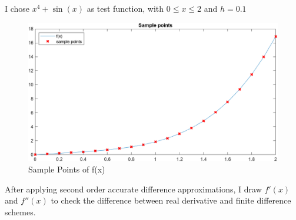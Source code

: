 \documentclass[
	12pt, %
]{fphw}
\begin{document}
I chose $x^4+\sin(x)$ as test function, with $0\leq x \leq 2$ and $h=0.1$

\begin{figure}[h!]
	\centering
	\includegraphics[width=0.8\columnwidth]{img/sample_points.png} %
	\caption{Sample Points of f(x)}
	\label{fig:sample_points}
\end{figure}

After applying second order accurate difference approximations, I draw $f'(x)$ and $f''(x)$ to check the difference between real derivative and finite difference schemes.
\end{document}
